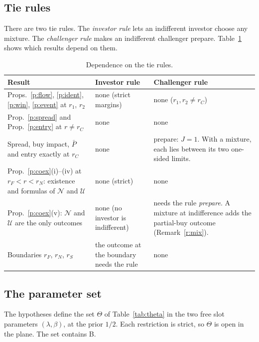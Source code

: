 \documentclass[12pt]{article}
\theoremstyle{definition}
\begin{document}
\subsection{Tie rules}

There are two tie rules.
The \emph{investor rule} lets an indifferent investor choose any mixture.
The \emph{challenger rule} makes an indifferent challenger prepare.
Table~\ref{tab:ties} shows which results depend on them.

\begin{table}[htbp]
\centering\small
\caption{Dependence on the tie rules.}\label{tab:ties}
\begin{tabular}{@{}p{5.2cm}p{3.0cm}p{4.9cm}@{}}
\toprule
Result & Investor rule & Challenger rule\\
\midrule
Props.~\ref{p:flow}, \ref{p:ident}, \ref{p:win}, \ref{p:event} at $r_1$, $r_2$ & none (strict margins) & none ($r_1,r_2\ne r_C$)\\
Prop.~\ref{p:spread} and Prop.~\ref{p:entry} at $r\ne r_C$ & none & none\\
Spread, buy impact, $\bar P$ and entry exactly at $r_C$ & none & prepare: $J=1$. With a mixture, each lies between its two one-sided limits.\\
Prop.~\ref{p:coex}(i)--(iv) at $r_F<r<r_N$: existence and formulas of $\mathcal N$ and $\mathcal U$ & none (strict) & none\\
Prop.~\ref{p:coex}(v): $\mathcal N$ and $\mathcal U$ are the only outcomes & none (no investor is indifferent) & needs the rule \emph{prepare}. A mixture at indifference adds the partial-buy outcome (Remark~\ref{r:mix}).\\
Boundaries $r_F$, $r_N$, $r_S$ & the outcome at the boundary needs the rule & none\\
\bottomrule
\end{tabular}
\end{table}

\subsection{The parameter set}

The hypotheses define the set $\Theta$ of Table~\ref{tab:theta} in the two free slot parameters $(\lambda,\beta)$, at the prior $1/2$.
Each restriction is strict, so $\Theta$ is open in the plane.
The set contains B.
\end{document}
